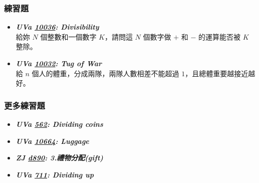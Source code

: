 \subsubsection*{練習題}
\begin{itemize}[label={\Checkmark}]
\item \textbf{\textit{UVa \href{http://uva.onlinejudge.org/external/100/10036.html}{10036}: Divisibility}}\\
給妳 $N$ 個整數和一個數字 $K$，請問這 $N$ 個數字做 $+$ 和 $-$ 的運算能否被 $K$ 整除。
\item \textbf{\textit{UVa \href{http://uva.onlinejudge.org/external/100/10032.html}{10032}: Tug of War}}\\
給 $n$ 個人的體重，分成兩隊，兩隊人數相差不能超過 $1$，且總體重要越接近越好。
\end{itemize}
\subsubsection*{更多練習題}
\begin{itemize}[label={\PencilLeftDown}]
\item \textbf{\textit{UVa \href{http://uva.onlinejudge.org/external/5/562.html}{562}: Dividing coins}}
\item \textbf{\textit{UVa \href{http://uva.onlinejudge.org/external/106/10664.html}{10664}: Luggage}}
\item \textbf{\textit{ZJ \href{http://zerojudge.tw/ShowProblem?problemid=d890}{d890}: 3.禮物分配(gift)}}
\item \textbf{\textit{UVa \href{http://uva.onlinejudge.org/external/7/711.html}{711}: Dividing up}}
\end{itemize}